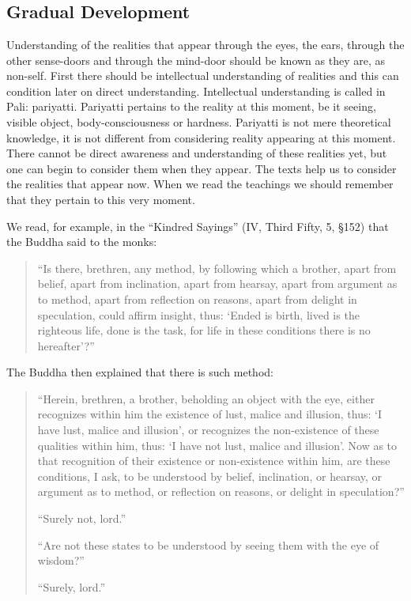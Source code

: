 \chapter[Gradual Development]{}
\section*{Gradual Development}


Understanding of the realities that appear through the eyes, the ears,
through the other sense-doors and through the mind-door should be known
as they are, as non-self. First there should be intellectual
understanding of realities and this can condition later on direct
understanding. Intellectual understanding is called in Pali: pariyatti.
Pariyatti pertains to the reality at this moment, be it seeing, visible
object, body-consciousness or hardness. Pariyatti is not mere
theoretical knowledge, it is not different from considering reality
appearing at this moment. There cannot be direct awareness and
understanding of these realities yet, but one can begin to consider them
when they appear. The texts help us to consider the realities that
appear now. When we read the teachings we should remember that they
pertain to this very moment.

We read, for example, in the ``Kindred Sayings'' (IV, Third Fifty, 5,
§152) that the Buddha said to the monks:

\begin{quote}

``Is there, brethren, any method, by following which a brother, apart
from belief, apart from inclination, apart from hearsay, apart from
argument as to method, apart from reflection on reasons, apart from
delight in speculation, could affirm insight, thus: `Ended is birth,
lived is the righteous life, done is the task, for life in these
conditions there is no hereafter'?''
\end{quote}

The Buddha then explained that there is such method:

\begin{quote}
``Herein, brethren, a brother, beholding an object with the eye, either
recognizes within him the existence of lust, malice and illusion, thus:
`I have lust, malice and illusion', or recognizes the non-existence of
these qualities within him, thus: `I have not lust, malice and
illusion'. Now as to that recognition of their existence or
non-existence within him, are these conditions, I ask, to be understood
by belief, inclination, or hearsay, or argument as to method, or
reflection on reasons, or delight in speculation?''

``Surely not, lord.''

``Are not these states to be understood by seeing them with the eye of
wisdom?''

``Surely, lord.''
\end{quote}

